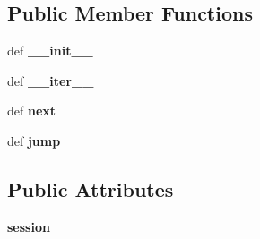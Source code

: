 \subsection*{Public Member Functions}
\begin{DoxyCompactItemize}
\item 
\hypertarget{classcheshire3_1_1base_store_1_1_file_system_iter_ac0023ef53886047820413b36bb1cae01}{def {\bfseries \-\_\-\-\_\-init\-\_\-\-\_\-}}\label{classcheshire3_1_1base_store_1_1_file_system_iter_ac0023ef53886047820413b36bb1cae01}

\item 
\hypertarget{classcheshire3_1_1base_store_1_1_file_system_iter_abfa20450f55e230850ab5411c0e5b1a0}{def {\bfseries \-\_\-\-\_\-iter\-\_\-\-\_\-}}\label{classcheshire3_1_1base_store_1_1_file_system_iter_abfa20450f55e230850ab5411c0e5b1a0}

\item 
\hypertarget{classcheshire3_1_1base_store_1_1_file_system_iter_aed4c34a34cb81df4f03f695ca558e5d7}{def {\bfseries next}}\label{classcheshire3_1_1base_store_1_1_file_system_iter_aed4c34a34cb81df4f03f695ca558e5d7}

\item 
\hypertarget{classcheshire3_1_1base_store_1_1_file_system_iter_a28f63c04f311c1e30ff1c09aea494076}{def {\bfseries jump}}\label{classcheshire3_1_1base_store_1_1_file_system_iter_a28f63c04f311c1e30ff1c09aea494076}

\end{DoxyCompactItemize}
\subsection*{Public Attributes}
\begin{DoxyCompactItemize}
\item 
\hypertarget{classcheshire3_1_1base_store_1_1_file_system_iter_ac4939ceefd84a190f440007a419b7e97}{{\bfseries session}}\label{classcheshire3_1_1base_store_1_1_file_system_iter_ac4939ceefd84a190f440007a419b7e97}

\end{DoxyCompactItemize}
